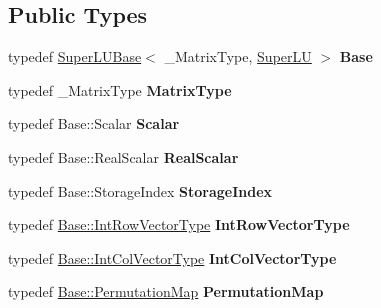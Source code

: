 \subsection*{Public Types}
\begin{DoxyCompactItemize}
\item 
\mbox{\label{class_eigen_1_1_super_l_u_a929eb972e66899842fda1b5f8c65426e}} 
typedef \hyperlink{class_eigen_1_1_super_l_u_base}{Super\+L\+U\+Base}$<$ \+\_\+\+Matrix\+Type, \hyperlink{class_eigen_1_1_super_l_u}{Super\+LU} $>$ {\bfseries Base}
\item 
\mbox{\label{class_eigen_1_1_super_l_u_a51df2ad6aa0b68c454390de0debc6a45}} 
typedef \+\_\+\+Matrix\+Type {\bfseries Matrix\+Type}
\item 
\mbox{\label{class_eigen_1_1_super_l_u_afab08072ca82cecde94fec93944bf01b}} 
typedef Base\+::\+Scalar {\bfseries Scalar}
\item 
\mbox{\label{class_eigen_1_1_super_l_u_a4b4d945d871a721ef24b3b6f51812f15}} 
typedef Base\+::\+Real\+Scalar {\bfseries Real\+Scalar}
\item 
\mbox{\label{class_eigen_1_1_super_l_u_a16513872355abbb0efa674592142a0f7}} 
typedef Base\+::\+Storage\+Index {\bfseries Storage\+Index}
\item 
\mbox{\label{class_eigen_1_1_super_l_u_ae44702f0150e31120ee366d1e2494ca8}} 
typedef \hyperlink{group___core___module}{Base\+::\+Int\+Row\+Vector\+Type} {\bfseries Int\+Row\+Vector\+Type}
\item 
\mbox{\label{class_eigen_1_1_super_l_u_a2b1324b63ee0d4e7e3cb8cbb0791830c}} 
typedef \hyperlink{group___core___module}{Base\+::\+Int\+Col\+Vector\+Type} {\bfseries Int\+Col\+Vector\+Type}
\item 
\mbox{\label{class_eigen_1_1_super_l_u_ae3e1cde5c9d38ce077af4e97109131ee}} 
typedef \hyperlink{group___core___module_class_eigen_1_1_map}{Base\+::\+Permutation\+Map} {\bfseries Permutation\+Map}
\item 
\mbox{\label{class_eigen_1_1_super_l_u_adcfd32038df7b0cbf35522a06616c813}} 

\end{DoxyCompactItemize}
